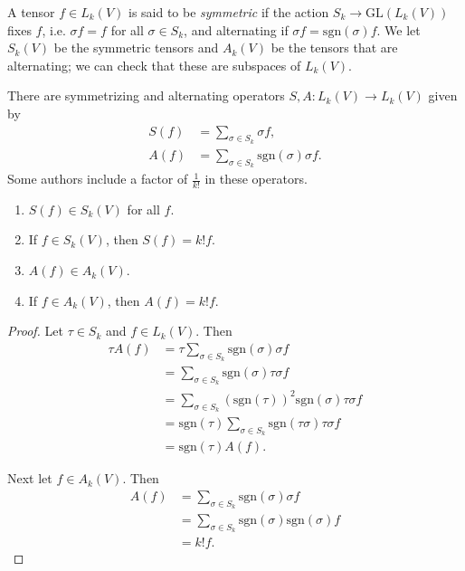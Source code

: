 \begin{defn}
A tensor $f \in L_k(V)$ is said to be \emph{symmetric} if the action
$S_k \to \mathrm{GL}(L_k(V))$ fixes $f$, i.e. $\sigma f = f$ for all
$\sigma \in S_k$, and alternating if
$\sigma f = \mathrm{sgn}(\sigma)f$. We let $S_k(V)$ be the symmetric
tensors and $A_k(V)$ be the tensors that are alternating; we can check
that these are subspaces of $L_k(V)$.

There are symmetrizing and alternating operators
$S, A: L_k(V) \to L_k(V)$ given by
\begin{align*}
   S(f)
&= \sum_{\sigma \in S_k}
     \sigma f, \\
   A(f)
&= \sum_{\sigma \in S_k}
     \mathrm{sgn}(\sigma)
     \sigma f.
\end{align*}
Some authors include a factor of $\frac{1}{k!}$ in these operators.
\end{defn}

\begin{lemma}
  \begin{enumerate}
    \item{
      $S(f) \in S_k(V)$ for all $f$.
    }
    \item{
      If $f \in S_k(V)$, then $S(f) = k! f$.
    }
    \item{
      $A(f) \in A_k(V)$.
    }
    \item{
      If $f \in A_k(V)$, then $A(f) = k! f$.
    }
  \end{enumerate}
\end{lemma}

\begin{proof}
Let $\tau \in S_k$ and $f \in L_k(V)$. Then
\begin{align*}
   \tau A(f)
&= \tau
     \sum_{\sigma \in S_k}
       \mathrm{sgn}(\sigma)
       \sigma f \\
&= \sum_{\sigma \in S_k}
     \mathrm{sgn}(\sigma)
     \tau \sigma f \\
&= \sum_{\sigma \in S_k}
     (\mathrm{sgn}(\tau))^2
     \mathrm{sgn}(\sigma)
     \tau \sigma f \\
&= \mathrm{sgn}(\tau)
   \sum_{\sigma \in S_k}
     \mathrm{sgn}(\tau \sigma)
     \tau \sigma f \\
&= \mathrm{sgn}(\tau) A(f).
\end{align*}

Next let $f \in A_k(V)$. Then
\begin{align*}
   A(f)
&= \sum_{\sigma \in S_k}
     \mathrm{sgn}(\sigma)
     \sigma f \\
&= \sum_{\sigma \in S_k}
     \mathrm{sgn}(\sigma)
     \mathrm{sgn}(\sigma)
     f \\
&= k! f.
\end{align*}
\end{proof}

